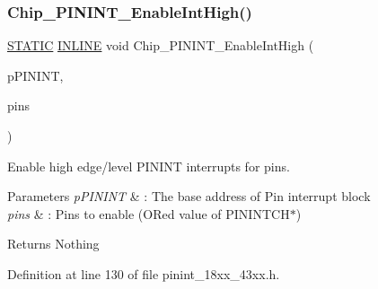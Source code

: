 \subsubsection{\texorpdfstring{Chip\+\_\+\+P\+I\+N\+I\+N\+T\+\_\+\+Enable\+Int\+High()}{Chip\_PININT\_EnableIntHigh()}}
{\footnotesize\ttfamily \hyperlink{group___l_p_c___types___public___macros_ga10b2d890d871e1489bb02b7e70d9bdfb}{S\+T\+A\+T\+IC} \hyperlink{spifi__18xx__43xx_8h_a2eb6f9e0395b47b8d5e3eeae4fe0c116}{I\+N\+L\+I\+NE} void Chip\+\_\+\+P\+I\+N\+I\+N\+T\+\_\+\+Enable\+Int\+High (\begin{DoxyParamCaption}\item[{\hyperlink{struct_l_p_c___p_i_n___i_n_t___t}{L\+P\+C\+\_\+\+P\+I\+N\+\_\+\+I\+N\+T\+\_\+T} $\ast$}]{p\+P\+I\+N\+I\+NT,  }\item[{uint32\+\_\+t}]{pins }\end{DoxyParamCaption})}



Enable high edge/level P\+I\+N\+I\+NT interrupts for pins. 


\begin{DoxyParams}{Parameters}
{\em p\+P\+I\+N\+I\+NT} & \+: The base address of Pin interrupt block \\
\hline
{\em pins} & \+: Pins to enable (O\+Red value of P\+I\+N\+I\+N\+T\+C\+H$\ast$) \\
\hline
\end{DoxyParams}
\begin{DoxyReturn}{Returns}
Nothing 
\end{DoxyReturn}


Definition at line 130 of file pinint\+\_\+18xx\+\_\+43xx.\+h.

\mbox{\label{group___p_i_n_i_n_t__18_x_x__43_x_x_ga314265e0674903dee85767e974b77b7d}} 
